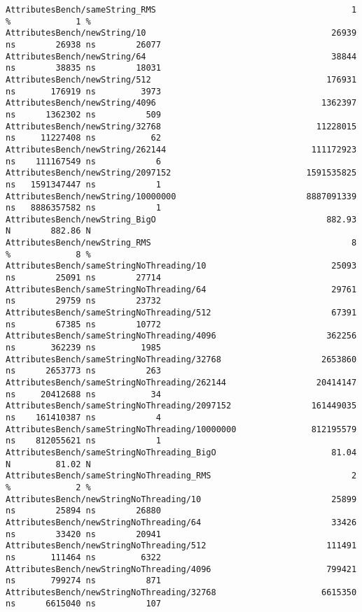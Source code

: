 \begin{code}
\begin{verbatim}
AttributesBench/sameString_RMS                                       1 %             1 %
AttributesBench/newString/10                                     26939 ns        26938 ns        26077
AttributesBench/newString/64                                     38844 ns        38835 ns        18031
AttributesBench/newString/512                                   176931 ns       176919 ns         3973
AttributesBench/newString/4096                                 1362397 ns      1362302 ns          509
AttributesBench/newString/32768                               11228015 ns     11227408 ns           62
AttributesBench/newString/262144                             111172923 ns    111167549 ns            6
AttributesBench/newString/2097152                           1591535825 ns   1591347447 ns            1
AttributesBench/newString/10000000                          8887091339 ns   8886357582 ns            1
AttributesBench/newString_BigO                                  882.93 N        882.86 N
AttributesBench/newString_RMS                                        8 %             8 %
AttributesBench/sameStringNoThreading/10                         25093 ns        25091 ns        27714
AttributesBench/sameStringNoThreading/64                         29761 ns        29759 ns        23732
AttributesBench/sameStringNoThreading/512                        67391 ns        67385 ns        10772
AttributesBench/sameStringNoThreading/4096                      362256 ns       362239 ns         1985
AttributesBench/sameStringNoThreading/32768                    2653860 ns      2653773 ns          263
AttributesBench/sameStringNoThreading/262144                  20414147 ns     20412688 ns           34
AttributesBench/sameStringNoThreading/2097152                161449035 ns    161410387 ns            4
AttributesBench/sameStringNoThreading/10000000               812195579 ns    812055621 ns            1
AttributesBench/sameStringNoThreading_BigO                       81.04 N         81.02 N
AttributesBench/sameStringNoThreading_RMS                            2 %             2 %
AttributesBench/newStringNoThreading/10                          25899 ns        25894 ns        26880
AttributesBench/newStringNoThreading/64                          33426 ns        33420 ns        20941
AttributesBench/newStringNoThreading/512                        111491 ns       111464 ns         6322
AttributesBench/newStringNoThreading/4096                       799421 ns       799274 ns          871
AttributesBench/newStringNoThreading/32768                     6615350 ns      6615040 ns          107

\end{verbatim}
\end{code}
